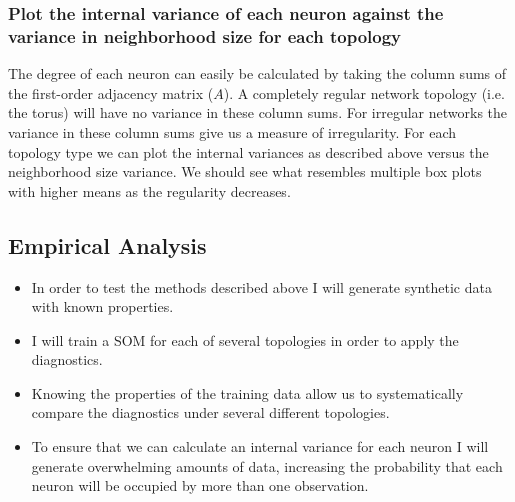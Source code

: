 \documentclass[10pt,titlepage]{article}
\begin{document}
\subsubsection{Plot the internal variance of each neuron against the variance in neighborhood size for each topology}
The degree of each neuron can easily be calculated by taking the column sums of
the first-order adjacency matrix ($A$).  A completely regular network
topology (i.e. the torus) will have no variance in these column sums.  For
irregular networks the variance in these column sums give us a measure of
irregularity.  For each topology type we can plot the internal
variances as described above versus the neighborhood size variance.  We should see
what resembles multiple box plots with higher means as the regularity decreases. 

\subsection{Empirical Analysis}
\begin{itemize}
\item In order to test the methods described above I will generate synthetic data with
known properties.
\item I will train a SOM for each of several topologies in order to apply the
diagnostics.
\item Knowing the properties of the training data allow us to systematically
compare the diagnostics under several different topologies.
\item To ensure that we can calculate an internal variance for
each neuron I will generate overwhelming amounts of data, increasing the
probability that each neuron will be occupied by more than one observation.
\end{itemize}


\end{document}
